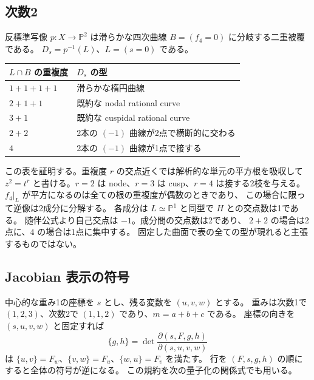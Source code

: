 \subsection{次数2}
反標準写像 $p:X\to\mathbb P^2$ は滑らかな四次曲線
$B=(f_4=0)$ に分岐する二重被覆である。
$D_s=p^{-1}(L)$、$L=(s=0)$ である。
\begin{center}
\begin{tabular}{lp{10cm}}
\toprule
$L\cap B$ の重複度 & $D_s$ の型\\
\midrule
$1+1+1+1$ & 滑らかな楕円曲線\\
$2+1+1$ & 既約な nodal rational curve\\
$3+1$ & 既約な cuspidal rational curve\\
$2+2$ & 2本の $(-1)$ 曲線が2点で横断的に交わる\\
$4$ & 2本の $(-1)$ 曲線が1点で接する\\
\bottomrule
\end{tabular}
\end{center}
この表を証明する。重複度 $r$ の交点近くでは解析的な単元の平方根を吸収して
$z^2=t^r$ と書ける。$r=2$ は node、$r=3$ は cusp、$r=4$ は接する2枝を与える。
$f_4|_L$ が平方になるのは全ての根の重複度が偶数のときであり、
この場合に限って逆像は2成分に分解する。
各成分は $L\simeq\mathbb P^1$ と同型で $H$ との交点数は1である。
随伴公式より自己交点は $-1$。成分間の交点数は2であり、
$2+2$ の場合は2点に、$4$ の場合は1点に集中する。
固定した曲面で表の全ての型が現れると主張するものではない。

\subsection{Jacobian 表示の符号}
中心的な重み1の座標を $s$ とし、残る変数を $(u,v,w)$ とする。
重みは次数1で $(1,2,3)$、次数2で $(1,1,2)$ であり、$m=a+b+c$ である。
座標の向きを $(s,u,v,w)$ と固定すれば
\[
 \{g,h\}=\det\frac{\partial(s,F,g,h)}{\partial(s,u,v,w)}
\]
は $\{u,v\}=F_w$、$\{v,w\}=F_u$、$\{w,u\}=F_v$ を満たす。
行を $(F,s,g,h)$ の順にすると全体の符号が逆になる。
この規約を次の量子化の関係式でも用いる。
